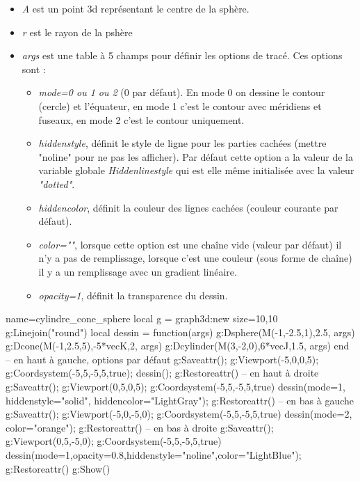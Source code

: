 \documentclass[%
10pt,%
a4paper,%
french,%
]%
{article}%
\newenvironment*{demo}[2][]{%
\gdef\legende{#2}%
\gdef\lab{#1}%
\bgroup
\VerbatimOut{\jobname.tmp}%
}%
{%
\endVerbatimOut%
\egroup%
\inputminted[ignorelexererrors=true,breaklines,bgcolor=Beige,linenos,numbersep=6pt,frame=single,fontsize=\footnotesize]{Lua}{\jobname.tmp}%
\begin{minipage}{0.9\textwidth}
\begin{center}
\captionof{figure}{\legende}\label{\lab}%
%
\end{center}
\end{minipage}
}
\begin{document}
\begin{itemize}
    \item \emph{A} est un point 3d représentant le centre de la sphère.
    \item \emph{r} est le rayon de la pshère
    \item \emph{args} est une table à 5 champs pour définir les options de tracé. Ces options sont :
        \begin{itemize}
            \item \emph{mode=0 ou 1 ou 2} (0 par défaut). En mode 0 on dessine le contour (cercle) et l'équateur, en mode 1 c'est le contour avec méridiens et fuseaux, en mode 2 c'est le contour uniquement.
            \item \emph{hiddenstyle}, définit le style de ligne pour les parties cachées (mettre "noline" pour ne pas les afficher). Par défaut cette option a la valeur de la variable globale \emph{Hiddenlinestyle} qui est elle même initialisée avec la valeur \emph{"dotted"}.
            \item \emph{hiddencolor}, définit la couleur des lignes cachées (couleur courante par défaut).
            \item \emph{color=""}, lorsque cette option est une chaîne vide (valeur par défaut) il n'y a pas de remplissage,  lorsque c'est une couleur (sous forme de chaîne) il y a un remplissage avec un gradient linéaire.
            \item \emph{opacity=1}, définit la transparence du dessin.
        \end{itemize}
\end{itemize}

\begin{demo}{Cylindres, cônes et sphères}
\begin{luadraw}{name=cylindre_cone_sphere}
local g = graph3d:new{ size={10,10} }
g:Linejoin("round")
local dessin = function(args)
    g:Dsphere(M(-1,-2.5,1),2.5, args)
    g:Dcone(M(-1,2.5,5),-5*vecK,2, args)
    g:Dcylinder(M(3,-2,0),6*vecJ,1.5, args)
end
-- en haut à gauche, options par défaut
g:Saveattr(); g:Viewport(-5,0,0,5); g:Coordsystem(-5,5,-5,5,true); dessin(); g:Restoreattr()
-- en haut à droite
g:Saveattr(); g:Viewport(0,5,0,5); g:Coordsystem(-5,5,-5,5,true)
dessin({mode=1, hiddenstyle="solid", hiddencolor="LightGray"}); g:Restoreattr()
-- en bas à gauche
g:Saveattr(); g:Viewport(-5,0,-5,0); g:Coordsystem(-5,5,-5,5,true)
dessin({mode=2, color="orange"}); g:Restoreattr()
-- en bas à droite
g:Saveattr(); g:Viewport(0,5,-5,0); g:Coordsystem(-5,5,-5,5,true)
dessin({mode=1,opacity=0.8,hiddenstyle="noline",color="LightBlue"}); g:Restoreattr()
g:Show()            
\end{luadraw}
\end{demo}
\end{document}
